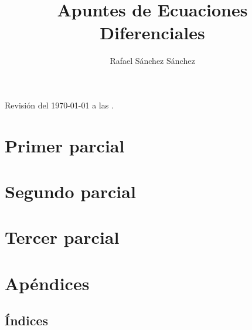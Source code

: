 \documentclass{book}
\title{Apuntes de Ecuaciones Diferenciales}
\author{Rafael S\'{a}nchez S\'{a}nchez}
\newcommand{\0}{\mathbf{0}}
\newcommand{\1}{\mathbf{1}}
\begin{document}
\begin{titlepage}
	
\end{titlepage}


Revisión del \today $ $ a las \currenttime.

\begin{center}

\end{center}

\tableofcontents
\part{Primer parcial}


\part{Segundo parcial}

\part{Tercer parcial}

\part{Apéndices}


%


%

\chapter{\'{I}ndices}

\renewcommand{\listtheoremname}{Lista de definiciones}
\listoftheorems[ignore={thm,eg,pro,cor,obs,lm,ex,th_ex}]

\renewcommand{\listtheoremname}{Lista de teoremas}
\listoftheorems[onlynamed,ignore={dfn,eg,cor,obs,ex,th_ex}]

\renewcommand{\listtheoremname}{Lista de ejemplos}
\listoftheorems[onlynamed,ignore={dfn,thm,pro,cor,obs,lm,ex,th_ex}]

\renewcommand{\listtheoremname}{Lista de ejercicios}
\listoftheorems[ignore={dfn,thm,pro,cor,obs,lm,eg}]

\printglossaries


\end{document}
